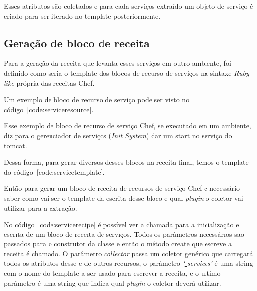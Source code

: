 Esses atributos são coletados e para cada serviços extraído um objeto de serviço
é criado para ser iterado no template posteriormente.

\subsection{Geração de bloco de receita}
Para a geração da receita que levanta esses serviços em outro ambiente, foi 
definido como seria o template dos blocos de recurso de serviços na sintaxe 
\textit{Ruby like} própria das receitas Chef.

Um exemplo de bloco de recurso de serviço pode ser visto no código~\ref{code:serviceresource}.

\noindent\begin{minipage}{\textwidth}
  
\end{minipage}\hfill

Esse exemplo de bloco de recurso de serviço Chef, se executado em um ambiente, diz para o
gerenciador de serviços (\textit{Init System}) dar um start no serviço do tomcat.

Dessa forma, para gerar diversos desses blocos na receita final, temos o template
do código~\ref{code:servicetemplate}.

\noindent\begin{minipage}{\textwidth}
  
\end{minipage}\hfill

Então para gerar um bloco de receita de recursos de serviço Chef é necessário
saber como vai ser o template da escrita desse bloco e qual \textit{plugin} o
coletor vai utilizar para a extração.

No código~\ref{code:servicerecipe} é possível ver a chamada para a inicialização e escrita de um
bloco de receita de serviços. Todos os parâmetros necessários são passados para
o construtor da classe e então o método create que escreve a receita é chamado.
O parâmetro \textit{collector} passa um coletor genérico que carregará todos os
atributos desse e de outros recursos, o parâmetro \textit{`\underline{ }services'} é uma
string com o nome do template a ser usado para escrever a receita, e o ultimo
parâmetro é uma string que indica qual \textit{plugin} o coletor deverá utilizar.

